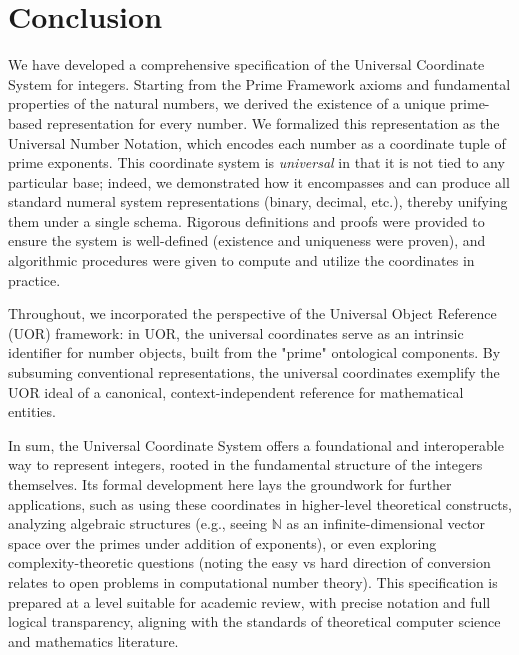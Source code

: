 \documentclass[11pt]{article}
\begin{document}
\section*{Conclusion}

We have developed a comprehensive specification of the Universal Coordinate System for integers. Starting from the Prime Framework axioms and fundamental properties of the natural numbers, we derived the existence of a unique prime-based representation for every number. We formalized this representation as the Universal Number Notation, which encodes each number as a coordinate tuple of prime exponents. This coordinate system is \emph{universal} in that it is not tied to any particular base; indeed, we demonstrated how it encompasses and can produce all standard numeral system representations (binary, decimal, etc.), thereby unifying them under a single schema. Rigorous definitions and proofs were provided to ensure the system is well-defined (existence and uniqueness were proven), and algorithmic procedures were given to compute and utilize the coordinates in practice. 

Throughout, we incorporated the perspective of the Universal Object Reference (UOR) framework: in UOR, the universal coordinates serve as an intrinsic identifier for number objects, built from the "prime" ontological components. By subsuming conventional representations, the universal coordinates exemplify the UOR ideal of a canonical, context-independent reference for mathematical entities. 

In sum, the Universal Coordinate System offers a foundational and interoperable way to represent integers, rooted in the fundamental structure of the integers themselves. Its formal development here lays the groundwork for further applications, such as using these coordinates in higher-level theoretical constructs, analyzing algebraic structures (e.g., seeing $\mathbb{N}$ as an infinite-dimensional vector space over the primes under addition of exponents), or even exploring complexity-theoretic questions (noting the easy vs hard direction of conversion relates to open problems in computational number theory). This specification is prepared at a level suitable for academic review, with precise notation and full logical transparency, aligning with the standards of theoretical computer science and mathematics literature.
\end{document}
